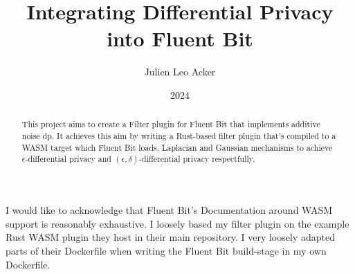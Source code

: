 \documentclass[bsc]{report/media/abdnthesis}
\title{Integrating Differential Privacy into Fluent Bit}
\author{Julien Leo Acker}
\date{2024}
\begin{document}
\maketitle
\makedeclaration

\begin{abstract}
This project aims to create a Filter plugin for Fluent Bit that implements additive noise \acrlong{dp}. It achieves this aim by writing a Rust-based filter plugin that's compiled to a WASM target which Fluent Bit loads. Laplacian and Gaussian mechanisms to achieve $\epsilon$-differential privacy and $(\epsilon,\delta)$-differential privacy respectfully.
\end{abstract}

\begin{acknowledgements}
I would like to acknowledge that Fluent Bit's Documentation around WASM support is reasonably exhaustive. I loosely based my filter plugin on the example Rust WASM plugin they host in their main repository. I very loosely adapted parts of their Dockerfile when writing the Fluent Bit build-stage in my own Dockerfile.

\end{acknowledgements}

\def\sfthing#1#2{\def#1{\mbox{{\small\normalfont\sffamily #2}}}}

\sfthing{\PP}{P}
\sfthing{\FF}{F}

\printglossary[type=\acronymtype]
\tableofcontents
\lstlistoflistings{}







% 

\appendix





\end{document}
